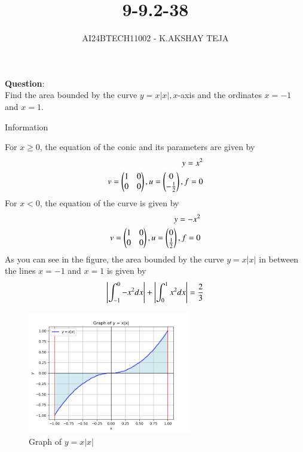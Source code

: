 \documentclass[journal]{IEEEtran}
\begin{document}

\vspace{3cm}

\title{9-9.2-38}
\author{AI24BTECH11002 - K.AKSHAY TEJA}
{\let\newpage\relax\maketitle}

\renewcommand{\thefigure}{\theenumi}
\renewcommand{\thetable}{\theenumi}
\setlength{\intextsep}{10pt} %


\renewcommand{\thetable}{\theenumi}


\textbf{Question}:\\
Find the area bounded by the curve $y = x|x|, x$-axis and the ordinates $x=-1$ and $x=1$.


 \solution
 \begin{table}[h!]
 	\centering
 	
 	\caption{Information}
 	\label{tab:9-9.2-38}
 \end{table}

For $x\geq0$, the equation of the conic and its parameters are given by 
\begin{align}
			    y = x^2\\
	v = \begin{pmatrix}1& 0\\0&0\end{pmatrix},  u = \begin{pmatrix}0 \\ -\frac{1}{2}\end{pmatrix},  f = 0
\end{align}
For $x<0$, the equation of the curve is given by 
\begin{align}
    y = -x^2\\ 
	v = \begin{pmatrix}1& 0\\0&0\end{pmatrix},  u = \begin{pmatrix}0 \\ \frac{1}{2}\end{pmatrix},  f = 0
\end{align}
As you can see in the figure, the area bounded by the curve $y = x|x|$ in between the lines $x = -1$ and $x = 1$ is given by
\begin{align}
	\left\vert\int_{-1}^{0} -x^2dx\right\vert + \left\vert\int_{0}^{1} x^2dx\right\vert = \frac{2}{3} 
\end{align}
 \begin{figure}[h!]
 \begin{center}
 	\includegraphics[width=0.635\textwidth]{Fig/fig.png}
 	\caption{Graph of $ y = x|x|$}
 	\label{fig:9-9.2-38 - Figure -1}
 \end{center}
 \end{figure}
\end{document}
